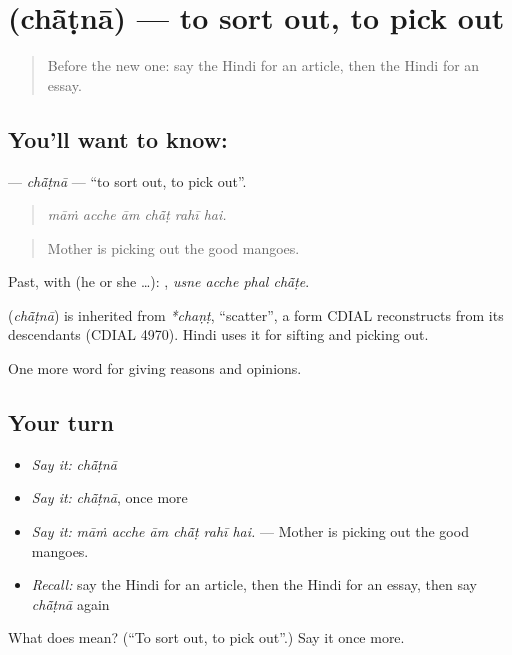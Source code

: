 \section[\texorpdfstring{\hi{छाँटना} (chā̃ṭnā)}{छाँटना (chā̃ṭnā)}]{ (chā̃ṭnā) — to sort out, to pick out}

\label{lesson:HI-C364-chatna}



\begin{quote}
Before the new one: say the Hindi for an article, then the Hindi for an essay.
\end{quote}

\subsection*{You'll want to know: }
\textbf{} — \emph{chā̃ṭnā} — \textquotedblleft{}to sort out, to pick out\textquotedblright{}.

\begin{quote}
     
\end{quote}

\begin{quote}
\emph{māṁ acche ām chā̃ṭ rahī hai.}
\end{quote}

\begin{quote}
Mother is picking out the good mangoes.
\end{quote}

Past, with  (he or she …):    , \emph{usne acche phal chā̃ṭe}.

\begin{cousinweb}
\textbf{} (\emph{chā̃ṭnā}) is inherited from \emph{*chaṇṭ}, \textquotedblleft{}scatter\textquotedblright{}, a form CDIAL reconstructs from its descendants (CDIAL 4970). Hindi uses it for sifting and picking out.
\end{cousinweb}

\begin{grammarlens}[title={What you've built}]
One more word for giving reasons and opinions.
\end{grammarlens}

\subsection*{Your turn}
\begin{itemize}
\raggedright
  \item \emph{Say it:} \emph{chā̃ṭnā}
  \item \emph{Say it:} \emph{chā̃ṭnā}, once more
  \item \emph{Say it:} \emph{māṁ acche ām chā̃ṭ rahī hai.} — Mother is picking out the good mangoes.
  \item \emph{Recall:} say the Hindi for an article, then the Hindi for an essay, then say \emph{chā̃ṭnā} again
\end{itemize}

\begin{tcolorbox}[breakable,colback=teal!4,colframe=teal!35!black,title={Before you move on}]
What does  mean? (\textquotedblleft{}To sort out, to pick out\textquotedblright{}.) Say it once more.
\end{tcolorbox}
